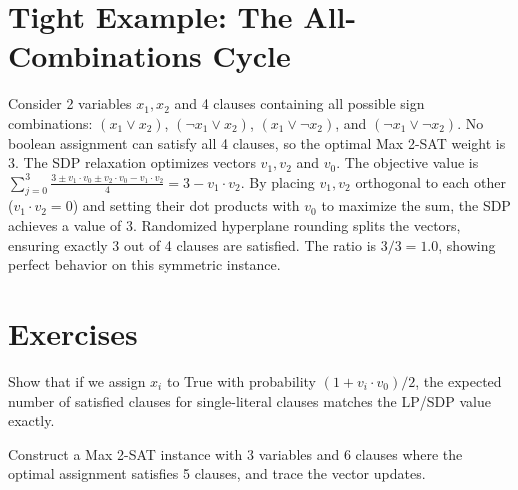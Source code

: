 \section{Tight Example: The All-Combinations Cycle}
Consider 2 variables $x_1, x_2$ and 4 clauses containing all possible sign combinations: $(x_1 \lor x_2)$, $(\neg x_1 \lor x_2)$, $(x_1 \lor \neg x_2)$, and $(\neg x_1 \lor \neg x_2)$.
No boolean assignment can satisfy all 4 clauses, so the optimal Max 2-SAT weight is 3.
The SDP relaxation optimizes vectors $v_1, v_2$ and $v_0$.
The objective value is $\sum_{j=0}^3 \frac{3 \pm v_1 \cdot v_0 \pm v_2 \cdot v_0 - v_1 \cdot v_2}{4} = 3 - v_1 \cdot v_2$.
By placing $v_1, v_2$ orthogonal to each other ($v_1 \cdot v_2 = 0$) and setting their dot products with $v_0$ to maximize the sum, the SDP achieves a value of 3.
Randomized hyperplane rounding splits the vectors, ensuring exactly 3 out of 4 clauses are satisfied. The ratio is $3/3 = 1.0$, showing perfect behavior on this symmetric instance.

\section{Exercises}
\begin{exercise}
Show that if we assign $x_i$ to True with probability $(1 + v_i \cdot v_0)/2$, the expected number of satisfied clauses for single-literal clauses matches the LP/SDP value exactly.
\end{exercise}
\begin{exercise}
Construct a Max 2-SAT instance with 3 variables and 6 clauses where the optimal assignment satisfies 5 clauses, and trace the vector updates.
\end{exercise}

